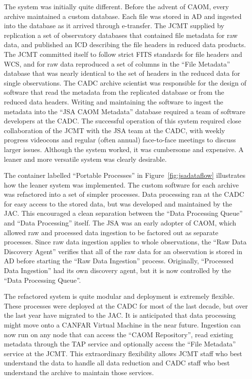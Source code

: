 \documentclass[final,authoryear,5p,times,twocolumn]{elsarticle}
\begin{document}
The system was initially quite different.  Before the advent of CAOM, every archive maintained a custom database.  Each file was stored in AD and ingested into the database as it arrived through e-transfer.  The JCMT supplied by replication a set of observatory databases that contained file metadata for raw data, and published an ICD describing the file headers in reduced data products. The JCMT committed itself to follow strict FITS standards for file headers and WCS, and for raw data reproduced a set of columns in the ``File Metadata'' database that was nearly identical  to the set of headers in the reduced data for single observations.   The CADC archive scientist was responsible for the design of software that read the metadata from the replicated database or from the reduced data headers.  Writing and maintaining the software to ingest the metadata into the ``JSA CAOM Metadata'' database required a team of software developers at the CADC.  The successful operation of this system required close collaboration of the JCMT with the JSA team at the CADC, with weekly progress videocons and regular (often annual) face-to-face meetings to discuss larger issues.  Although the system worked, it was cumbersome and expensive.  A leaner and more versatile system was clearly desirable.

The container labelled ``Portable Processes'' in Figure~\ref{fig:jsadataflow} illustrates how the leaner system was implemented.  The custom software for each archive was refactored into a set of simpler processes.  Data processing ran at the CADC for easy access to the stored data, but was developed and maintained by the JAC.  This encouraged a clean separation between the ``Data Processing Queue'' and  ``Data Processing'' itself.    The JSA was an early adopter of CAOM, which allowed raw and processed data ingestion to be factored out as separate processes.  Since raw data ingestion applies to whole observations, the ``Raw Data Discovery Agent'' verifies that all of the raw data for an observation is stored in AD before starting the ``Raw Data Ingestion'' process.  Originally, ``Processed Data Ingestion'' had its own discovery agent, but it is now controlled by the ``Data Processing Queue''.

The refactored system is quite modular and deployment is extremely flexible. These processes were deployed at the CADC for most of the last decade, but over the last year have migrated to the JAC.  It is anticipated that data processing might move onto a CANFAR Virtual Machine in the near future.  Ingestion can now run on any node that can access the ``CAOM Repository'', read existing metadata through the TAP service and optionally access the ``File Metadata'' service at the JCMT.   This extraordinary flexibility allows JCMT staff who best understand the data to handle all data reduction and CADC staff who best understand the archive to maintain those services.
\end{document}
